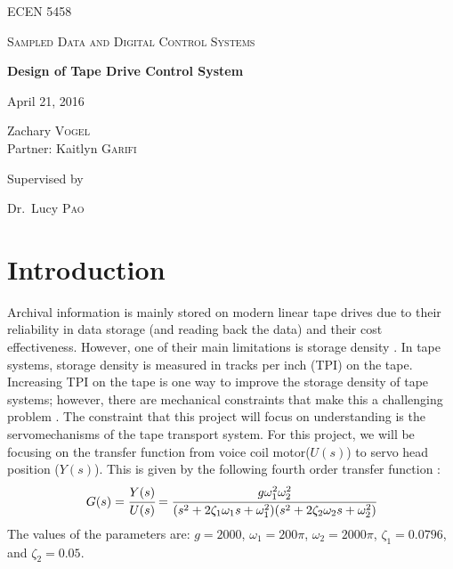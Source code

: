 \documentclass[11pt]{article}
\begin{document}
 
\begin{titlepage}
	\centering
	{\scshape\LARGE ECEN 5458 \par}
	\vspace{0.5cm}
	{\scshape\Large Sampled Data and Digital Control Systems\par}
	\vspace{2cm}
	{\huge\bfseries Design of Tape Drive Control System\par}
	{\large April 21, 2016\par}
	\vspace{2cm}
	{\Large Zachary \textsc{Vogel} \\
	Partner: Kaitlyn \textsc{Garifi}\par}
	\vfill
	{\large Supervised by\par
	Dr.~Lucy \textsc{Pao}}
	\vfill
\end{titlepage}

\tableofcontents
\newpage


\section{Introduction}

Archival information is mainly stored on modern linear tape drives due to their reliability in data storage (and reading back the data) and their cost effectiveness. However, one of their main limitations is storage density \cite{thesis}. In tape systems, storage density is measured in tracks per inch (TPI) on the tape. Increasing TPI on the tape is one way to improve the storage density of tape systems; however, there are mechanical constraints that make this a challenging problem \cite{thesis}. The constraint that this project will focus on understanding is the servomechanisms of the tape transport system. For this project, we will be focusing on the transfer function from voice coil motor($U(s)$) to servo head position ($Y(s)$). This is given by the following fourth order transfer function \cite{thesis}:
\begin{equation} G(s)= \cfrac{Y(s)}{U(s)}= \cfrac{g\omega_{1}^{2}\omega_{2}^{2}}{(s^2+2\zeta_{1}\omega_{1}s+\omega_{1}^{2})(s^2+2\zeta_{2}\omega_{2}s+\omega_{2}^{2})} \end{equation}
The values of the parameters are: $g=2000$, $\omega_{1}=200\pi$, $\omega_{2}=2000\pi$, $\zeta_{1}=0.0796$, and $\zeta_{2}=0.05$.
\end{document}
